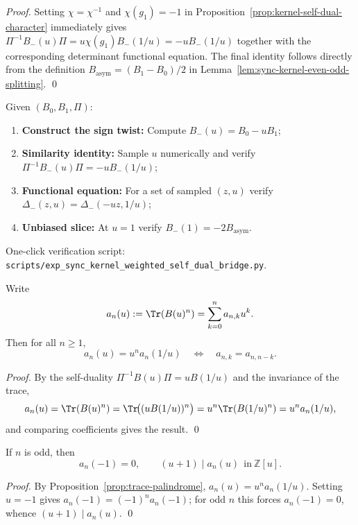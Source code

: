 \begin{proof}
Setting \(\chi=\chi^{-1}\) and \(\chi(g_1)=-1\) in Proposition~\ref{prop:kernel-self-dual-character} immediately gives
\(
\Pi^{-1}B_{-}(u)\Pi=u\chi(g_1)B_{-}(1/u)=-uB_{-}(1/u)
\)
together with the corresponding determinant functional equation.
The final identity follows directly from the definition \(B_{\mathrm{asym}}=(B_1-B_0)/2\) in Lemma~\ref{lem:sync-kernel-even-odd-splitting}. \qed
\end{proof}

\begin{remark}\label{rem:kernel-self-dual-sign-twist-bridge}
Given \((B_0,B_1,\Pi)\):
\begin{enumerate}
  \item \textbf{Construct the sign twist:} Compute \(B_{-}(u)=B_0-uB_1\);
  \item \textbf{Similarity identity:} Sample \(u\) numerically and verify \(\Pi^{-1}B_{-}(u)\Pi=-uB_{-}(1/u)\);
  \item \textbf{Functional equation:} For a set of sampled \((z,u)\) verify \(\Delta_{-}(z,u)=\Delta_{-}(-uz,1/u)\);
  \item \textbf{Unbiased slice:} At \(u=1\) verify \(B_{-}(1)=-2B_{\mathrm{asym}}\).
\end{enumerate}
One-click verification script: \texttt{scripts/exp\_sync\_kernel\_weighted\_self\_dual\_bridge.py}.
\end{remark}

\begin{proposition}\label{prop:trace-palindrome}
Write
\[
a_n(u):=\Tr(B(u)^n)=\sum_{k=0}^{n}a_{n,k}u^k.
\]
Then for all $n\ge 1$,
\[
a_n(u)=u^n a_n(1/u)
\quad\Longleftrightarrow\quad
a_{n,k}=a_{n,n-k}.
\]
\end{proposition}

\begin{proof}
By the self-duality $\Pi^{-1}B(u)\Pi=uB(1/u)$ and the invariance of the trace,
\[
a_n(u)=\Tr(B(u)^n)=\Tr\!\bigl((uB(1/u))^n\bigr)=u^n\Tr(B(1/u)^n)=u^n a_n(1/u),
\]
and comparing coefficients gives the result. \qed
\end{proof}

\begin{corollary}\label{cor:trace-odd-vanish}
If $n$ is odd, then
\[
a_n(-1)=0,
\qquad
(u+1)\mid a_n(u)\ \ \text{in}\ \mathbb{Z}[u].
\]
\end{corollary}
\begin{proof}
By Proposition~\ref{prop:trace-palindrome}, $a_n(u)=u^n a_n(1/u)$. Setting $u=-1$ gives $a_n(-1)=(-1)^n a_n(-1)$; for odd $n$ this forces $a_n(-1)=0$, whence $(u+1)\mid a_n(u)$. \qed
\end{proof}

